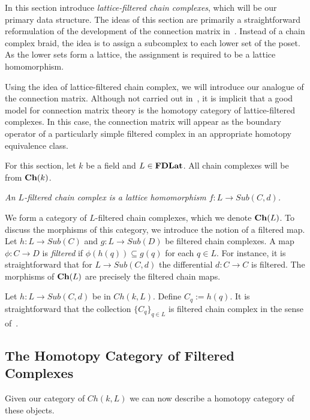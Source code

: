 In this section introduce {\em lattice-filtered chain complexes}, which will be our primary data structure.    The ideas of this section are primarily a straightforward reformulation of the development of the connection matrix in~\cite{salamon}.  Instead of a chain complex braid, the idea is to assign a subcomplex to each lower set of the poset.  As the lower sets form a lattice, the assignment is required to be a lattice homomorphism. 


 Using the idea of lattice-filtered chain complex, we will introduce our analogue of the connection matrix.   Although not carried out in~\cite{salamon}, it is implicit that a good model for connection matrix theory is the homotopy category of lattice-filtered complexes.  In this case, the connection matrix will appear as the boundary operator of a particularly simple filtered complex in an appropriate homotopy equivalence class.


 For this section, let $k$ be a field and $L\in {\bf FDLat}$.  All chain complexes will be from ${\bf Ch}(k)$.

\begin{defn}
{\em
An {\em $L$-filtered chain complex} is a lattice homomorphism $f:L\to Sub(C,d)$.
}
\end{defn}

We form a category of $L$-filtered chain complexes, which we denote ${\bf Ch}(L)$.  To discuss the morphisms of this category, we introduce the notion of a filtered map.  Let $h:L\to Sub(C)$ and $g:L\to Sub(D)$ be filtered chain complexes. A map $\phi:C\to D$ is {\em filtered} if $\phi(h(q))\subseteq g(q)$ for each $q\in L$.  For instance, it is straightforward that for $L\to Sub(C,d)$ the differential $d:C\to C$ is filtered.  The morphisms of ${\bf Ch}(L)$ are precisely the filtered chain maps.

\begin{rem}
Let $h:L\to Sub(C,d)$ be in $Ch(k,L)$.  Define $C_q := h(q)$. It is straightforward that the collection $\{C_q\}_{q\in L}$ is filtered chain complex in the sense of~\cite[Section 7]{salamon}.
\end{rem}




\subsection{The Homotopy Category of Filtered Complexes}\label{sec:homotopy}

Given our category of $Ch(k,L)$ we can now describe a homotopy category of these objects.

